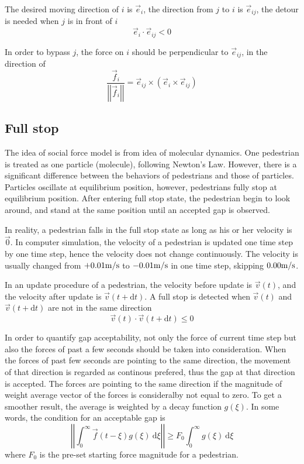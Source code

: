 \documentclass{article}
\newcommand{\lb}{\left(}
\newcommand{\rb}{\right)}
\newcommand{\db}[1]{{\lb {#1} \rb}}
\newcommand{\abs}[1]{\left| {#1} \right|}
\newcommand{\dd}{{\ \mathrm d}}
\begin{document}
            The desired moving direction of $i$ is $\vec{e}_i$, the direction from $j$ to $i$ is $\vec{e}_{ij}$, the detour is needed when $j$ is in front of $i$
            $$
                \vec{e}_i \cdot \vec{e}_{ij} < 0
            $$

            In order to bypass $j$, the force on $i$ should be perpendicular to $\vec{e}_{ij}$, in the direction of
            $$
                \frac{\vec{f}_i}{\abs{\abs{\vec{f}_i}}} = \vec{e}_{ij} \times \db{ \vec{e}_i \times \vec{e}_{ij} }
            $$
        \subsection{Full stop}
            The idea of social force model is from idea of molecular dynamics.
            One pedestrian is treated as one particle (molecule), following Newton's Law.
            However, there is a significant difference between the behaviors of pedestrians and those of particles.
            Particles oscillate at equilibrium position, however, pedestrians fully stop at equilibrium position.
            After entering full stop state, the pedestrian begin to look around, and stand at the same position until an accepted gap is observed.

            In reality, a pedestrian falls in the full stop state as long as his or her velocity is $\vec{0}$. In computer simulation, the velocity of a pedestrian is updated one time step by one time step, hence the velocity does not change continuously. The velocity is usually changed from $+0.01\rm{m/s}$ to $-0.01\rm{m/s}$ in one time step, skipping $0.00\rm{m/s}$.

            In an update procedure of a pedestrian, the velocity before update is $\vec{v}\db{t}$, and the velocity after update is $\vec{v}\db{t+\mathrm{d}t}$. A full stop is detected when $\vec{v}\db{t}$ and $\vec{v}\db{t+\mathrm{d}t}$ are not in the same direction
            $$
                \vec{v}\db{t} \cdot \vec{v}\db{t+\mathrm{d}t} \le 0
            $$

            In order to quantify gap acceptability, not only the force of current time step but also the forces of past a few seconds should be taken into consideration.
            When the forces of past few seconds are pointing to the same direction, the movement of that direction is regarded as continous prefered, thus the gap at that direction is accepted.
            The forces are pointing to the same direction if the magnitude of weight average vector of the forces is consideralby not equal to zero.
            To get a smoother result, the average is weighted by a decay function $g\db{\xi}$. In some words, the condition for an acceptable gap is
            $$
                \abs{\abs{ \int_0^\infty \vec{f}\db{t-\xi}g\db{\xi} \dd \xi} }\ge F_0 {\int_0^\infty g\db{\xi} \dd \xi}
            $$
            where $F_0$ is the pre-set starting force magnitude for a pedestrian.
\end{document}
